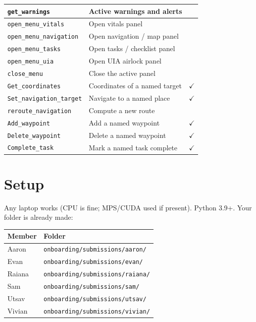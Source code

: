 \documentclass[11pt]{article}
\begin{document}
\begin{center}
\begin{tabular}{@{}llc@{}}
\texttt{get\_warnings} & Active warnings and alerts & \\
\midrule
\texttt{open\_menu\_vitals} & Open vitals panel & \\
\texttt{open\_menu\_navigation} & Open navigation / map panel & \\
\texttt{open\_menu\_tasks} & Open tasks / checklist panel & \\
\texttt{open\_menu\_uia} & Open UIA airlock panel & \\
\texttt{close\_menu} & Close the active panel & \\
\midrule
\texttt{Get\_coordinates} & Coordinates of a named target & $\checkmark$ \\
\texttt{Set\_navigation\_target} & Navigate to a named place & $\checkmark$ \\
\texttt{reroute\_navigation} & Compute a new route & \\
\texttt{Add\_waypoint} & Add a named waypoint & $\checkmark$ \\
\texttt{Delete\_waypoint} & Delete a named waypoint & $\checkmark$ \\
\texttt{Complete\_task} & Mark a named task complete & $\checkmark$ \\
\bottomrule
\end{tabular}
\end{center}

\newpage
\section{Setup}

Any laptop works (CPU is fine; MPS/CUDA used if present). Python 3.9+.
Your folder is already made:

\begin{center}
\begin{tabular}{@{}ll@{}}
\toprule
Member & Folder \\
\midrule
Aaron  & \texttt{onboarding/submissions/aaron/} \\
Evan   & \texttt{onboarding/submissions/evan/} \\
Raiana & \texttt{onboarding/submissions/raiana/} \\
Sam    & \texttt{onboarding/submissions/sam/} \\
Utsav  & \texttt{onboarding/submissions/utsav/} \\
Vivian & \texttt{onboarding/submissions/vivian/} \\
\bottomrule
\end{tabular}
\end{center}
\end{document}
